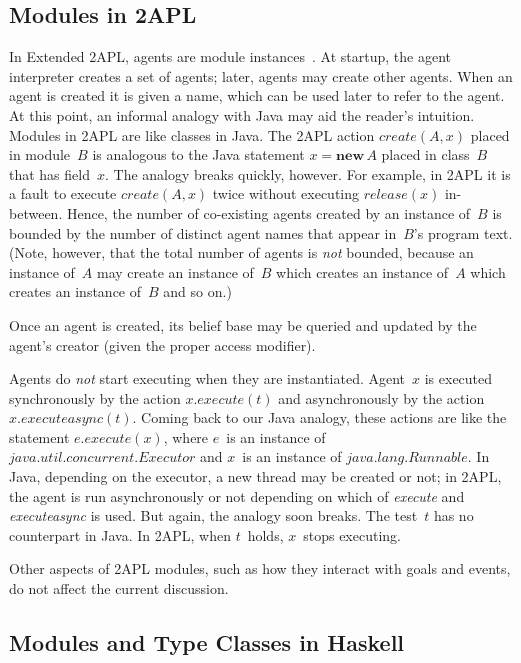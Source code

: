 \documentclass[conference,compsoc]{IEEEtran}
\begin{document}
\subsection{Modules in 2APL}

In Extended 2APL, agents are module
instances~\cite{DBLP:conf/prima/DastaniMS08}. At startup, the agent
interpreter creates a set of agents; later, agents may create other agents.
When an agent is created it is given a name, which can be used later to
refer to the agent. At this point, an informal analogy with Java may aid
the reader's intuition. Modules in 2APL are like classes in Java. The 2APL
action $\mathit{create}(A,x)$ placed in module~$B$ is analogous to the Java
statement $x=\mathbf{new}\,A$ placed in class~$B$ that has field~$x$.  The
analogy breaks quickly, however. For example, in 2APL it is a fault to
execute $\mathit{create}(A,x)$ twice without executing
$\mathit{release}(x)$ in-between. Hence, the number of co-existing agents
created by an instance of~$B$ is bounded by the number of distinct agent
names that appear in~$B$'s program text. (Note, however, that the total
number of agents is \emph{not} bounded, because an instance of~$A$ may
create an instance of~$B$ which creates an instance of~$A$ which creates an
instance of~$B$ and so on.)

Once an agent is created, its belief base may be queried and updated by the
agent's creator (given the proper access modifier).

Agents do \emph{not} start executing when they are instantiated. Agent~$x$
is executed synchronously by the action $x.\mathit{execute}(t)$ and
asynchronously by the action $x.\mathit{executeasync}(t)$. Coming back to
our Java analogy, these actions are like the statement
$e.\mathit{execute}(x)$, where $e$~is an instance of
$\mathit{java}.\mathit{util}.\mathit{concurrent}.\mathit{Executor}$ and
$x$~is an instance of $\mathit{java}.\mathit{lang}.\mathit{Runnable}$.  In
Java, depending on the executor, a new thread may be created or not; in
2APL, the agent is run asynchronously or not depending on which of
\textit{execute} and \textit{executeasync} is used. But again, the analogy
soon breaks. The test~$t$ has no counterpart in Java. In 2APL, when
$t$~holds, $x$~stops executing.

Other aspects of 2APL modules, such as how they interact with goals and
events, do not affect the current discussion.

\subsection{Modules and Type Classes in Haskell}
\end{document}
